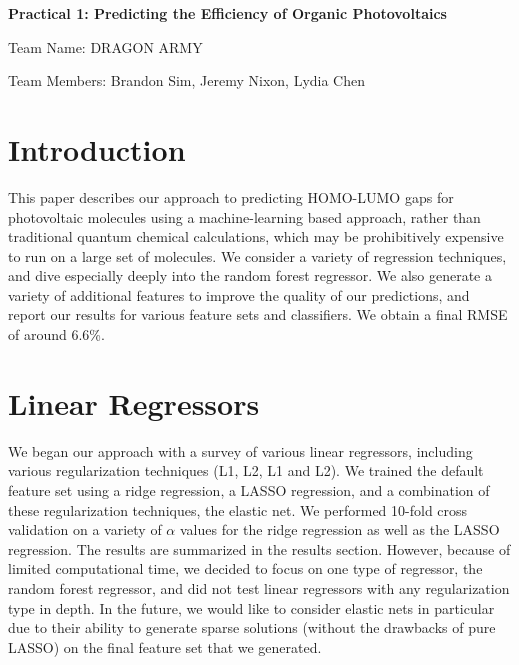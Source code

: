 \documentclass[11pt]{article}
\begin{document}
\centerline{\Large{\textbf{Practical 1: Predicting the Efficiency of Organic Photovoltaics}}}
\vspace{1em}
\centerline{Team Name: \FiveStarOpen\FiveStarOpen\FiveStarOpen \hspace{.05em} DRAGON ARMY \FiveStarOpen\FiveStarOpen\FiveStarOpen}
\centerline{Team Members: Brandon Sim, Jeremy Nixon, Lydia Chen}
\vspace{1em}
\section*{Introduction}
This paper describes our approach to predicting HOMO-LUMO gaps for photovoltaic molecules using a machine-learning based approach, rather than traditional quantum chemical calculations, which may be prohibitively expensive to run on a large set of molecules. We consider a variety of regression techniques, and dive especially deeply into the random forest regressor. We also generate a variety of additional features to improve the quality of our predictions, and report our results for various feature sets and classifiers. We obtain a final RMSE of around 6.6\%.

\section*{Linear Regressors}
We began our approach with a survey of various linear regressors, including various regularization techniques (L1, L2, L1 and L2). We trained the default feature set using a ridge regression, a LASSO regression, and a combination of these regularization techniques, the elastic net. We performed 10-fold cross validation on a variety of $\alpha$ values for the ridge regression as well as the LASSO regression. The results are summarized in the results section. However, because of limited computational time, we decided to focus on one type of regressor, the random forest regressor, and did not test linear regressors with any regularization type in depth. In the future, we would like to consider elastic nets in particular due to their ability to generate sparse solutions (without the drawbacks of pure LASSO) on the final feature set that we generated.
\end{document}

